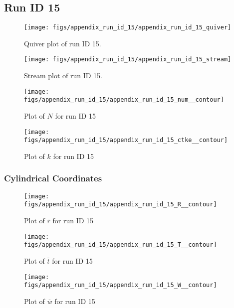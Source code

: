 \subsection{Run ID 15}
\begin{figure}[H]
\centering
\texttt{[image: figs/appendix\_run\_id\_15/appendix\_run\_id\_15\_quiver]}
\caption{Quiver plot of run ID 15.}
\label{fig:appendix_run_id_15_quiver}
\end{figure}


\begin{figure}[H]
\centering
\texttt{[image: figs/appendix\_run\_id\_15/appendix\_run\_id\_15\_stream]}
\caption{Stream plot of run ID 15.}
\label{fig:appendix_run_id_15_stream}
\end{figure}


\begin{figure}[H]
\centering
\texttt{[image: figs/appendix\_run\_id\_15/appendix\_run\_id\_15\_num\_\_contour]}
\caption{Plot of $N$ for run ID 15}
\label{fig:appendix_run_id_15_num__contour}
\end{figure}


\begin{figure}[H]
\centering
\texttt{[image: figs/appendix\_run\_id\_15/appendix\_run\_id\_15\_ctke\_\_contour]}
\caption{Plot of $k$ for run ID 15}
\label{fig:appendix_run_id_15_ctke__contour}
\end{figure}


\subsubsection{Cylindrical Coordinates}
\begin{figure}[H]
\centering
\texttt{[image: figs/appendix\_run\_id\_15/appendix\_run\_id\_15\_R\_\_contour]}
\caption{Plot of $\overline{r}$ for run ID 15}
\label{fig:appendix_run_id_15_R__contour}
\end{figure}


\begin{figure}[H]
\centering
\texttt{[image: figs/appendix\_run\_id\_15/appendix\_run\_id\_15\_T\_\_contour]}
\caption{Plot of $\overline{t}$ for run ID 15}
\label{fig:appendix_run_id_15_T__contour}
\end{figure}


\begin{figure}[H]
\centering
\texttt{[image: figs/appendix\_run\_id\_15/appendix\_run\_id\_15\_W\_\_contour]}
\caption{Plot of $\overline{w}$ for run ID 15}
\label{fig:appendix_run_id_15_W__contour}
\end{figure}


